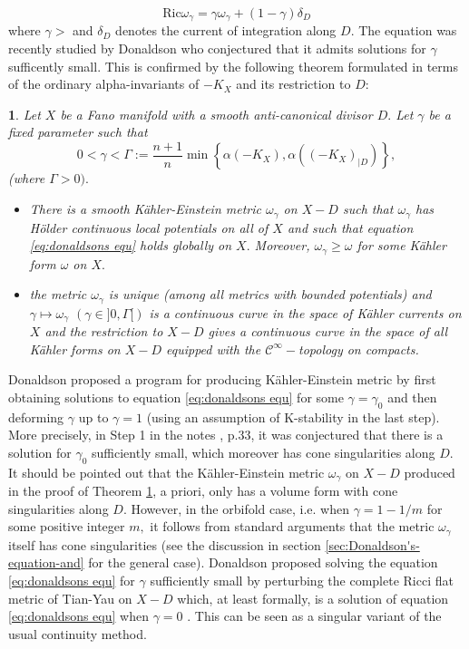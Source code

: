 \documentclass[11pt,oneside,english]{amsart}
\numberwithin{equation}{section}
\numberwithin{figure}{section}
\theoremstyle{plain}
\newtheorem{thm}{\protect\theoremname}[section]
\theoremstyle{plain}
\theoremstyle{plain}
\theoremstyle{plain}
\theoremstyle{remark}
\theoremstyle{definition}
\providecommand{\theoremname}{Theorem}
\begin{document}
\begin{equation}
\mbox{Ric}\omega_{\gamma}=\gamma\omega_{\gamma}+(1-\gamma)\delta_{D}\label{eq:donaldsons equ}
\end{equation}
 where $\gamma>$ and $\delta_{D}$ denotes the current of integration
along $D.$ The equation was recently studied by Donaldson who conjectured
that it admits solutions for $\gamma$ sufficently small. This is
confirmed by the following theorem formulated in terms of the ordinary
alpha-invariants of $-K_{X}$ and its restriction to $D:$ 
\begin{thm}
\label{thm:don eq}Let $X$ be a Fano manifold with a smooth anti-canonical
divisor $D.$ Let $\gamma$ be a fixed parameter such that 
\[
0<\gamma<\Gamma:=\frac{n+1}{n}\min\left\{ \alpha(-K_{X}),\alpha((-K_{X})_{|D})\right\} ,
\]
 (where $\Gamma>0).$ 
\begin{itemize}
\item There is a smooth Kähler-Einstein metric $\omega_{\gamma}$ on $X-D$
such that $\omega_{\gamma}$ has Hölder continuous local potentials
on all of $X$ and such that equation \ref{eq:donaldsons equ} holds
globally on $X.$ Moreover, $\omega_{\gamma}\geq\omega$ for some
Kähler form $\omega$ on $X.$ 
\item the metric $\omega_{\gamma}$ is unique (among all metrics with bounded
potentials) and $\gamma\mapsto\omega_{\gamma}$ $(\gamma\in]0,\Gamma[)$
is a continuous curve in the space of Kähler currents on $X$ and
the restriction to $X-D$ gives a continuous curve in the space of
all Kähler forms on $X-D$ equipped with the $\mathcal{C}^{\infty}-$topology
on compacts. 
\end{itemize}
\end{thm}
Donaldson proposed a program for producing Kähler-Einstein metric
by first obtaining solutions to equation \ref{eq:donaldsons equ}
for some $\gamma=\gamma_{0}$ and then deforming $\gamma$ up to $\gamma=1$
(using an assumption of K-stability in the last step). More precisely,
in Step 1 in the notes \cite{do-2}, p.33, it was conjectured that
there is a solution for $\gamma_{0}$ sufficiently small, which moreover
has\emph{ }cone singularities along $D.$ It should be pointed out
that the Kähler-Einstein metric $\omega_{\gamma}$ on $X-D$ produced
in the proof of Theorem \ref{thm:don eq}, a priori, only has a volume
form with cone singularities along $D.$ However, in the orbifold
case, i.e. when $\gamma=1-1/m$ for some positive integer $m,$ it
follows from standard arguments \cite{t-y0} that the metric $\omega_{\gamma}$
itself has cone singularities (see the discussion in section \ref{sec:Donaldson's-equation-and}
for the general case). Donaldson proposed solving the equation \ref{eq:donaldsons equ}
for $\gamma$ sufficiently small by perturbing the complete Ricci
flat metric of Tian-Yau on $X-D$ which, at least formally, is a solution
of equation \ref{eq:donaldsons equ} when $\gamma=0$ \cite{t-y-1}.
This can be seen as a singular variant of the usual continuity method. 
\end{document}
